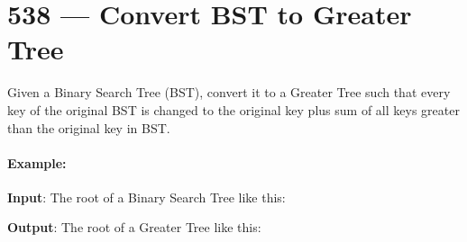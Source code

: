 \section{538 --- Convert BST to Greater Tree}
Given a Binary Search Tree (BST), convert it to a Greater Tree such that every key of the original BST is changed to the original key plus sum of all keys greater than the original key in BST.

\paragraph{Example:}

\begin{flushleft}
\textbf{Input}: The root of a Binary Search Tree like this:

\begin{figure}[H]
\end{figure}


\textbf{Output}: The root of a Greater Tree like this:

\begin{figure}[H]
\end{figure}

\end{flushleft}
